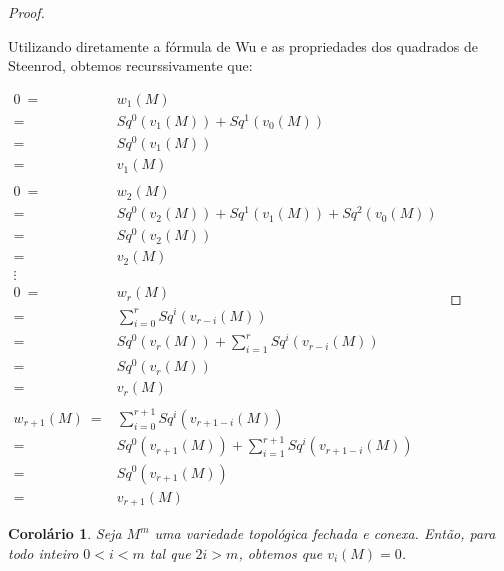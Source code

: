 \documentclass[12pt,oneside]{book} %
\newtheorem{cor}    {\hspace{0.5cm}Corol\'ario}[chapter]
\newcommand{\ds}{\displaystyle}
\begin{document}
\begin{proof}
	
	\
	
	\par Utilizando diretamente a fórmula de Wu e as propriedades dos quadrados de Steenrod, obtemos recurssivamente que: \newline
	
	$ \begin{array}{rl}
		0 \ = & w_{1}(M) \\
		= & Sq^{0}(v_{1}(M))+Sq^{1}(v_{0}(M)) \\
		= & Sq^{0}(v_{1}(M)) \\
		= & v_{1}(M) \\
		& \\
		0 \ = & w_{2}(M) \\
		= & Sq^{0}(v_{2}(M))+Sq^{1}(v_{1}(M))+Sq^{2}(v_{0}(M)) \\
		= & Sq^{0}(v_{2}(M)) \\
		= & v_{2}(M) \\
		\vdots & \\
		0 \ = & w_{r}(M) \\
		= & \ds\sum_{i=0}^{r}Sq^{i}(v_{r-i}(M)) \\
		= & Sq^{0}(v_{r}(M))+\ds\sum_{i=1}^{r}Sq^{i}(v_{r-i}(M)) \\
		= & Sq^{0}(v_{r}(M)) \\
		= & v_{r}(M) \\
		& \\
		w_{r+1}(M) \ = & \ds\sum_{i=0}^{r+1}Sq^{i}(v_{r+1-i}(M)) \\
		= & Sq^{0}(v_{r+1}(M))+\ds\sum_{i=1}^{r+1}Sq^{i}(v_{r+1-i}(M)) \\
		= & Sq^{0}(v_{r+1}(M)) \\
		= & v_{r+1}(M)
	\end{array} $
	
\end{proof}

\begin{cor}\label{ap_wu_3}
	Seja $M^{m}$ uma variedade topológica fechada e conexa. Então, para todo inteiro $0< i< m$ tal que $2i>m$, obtemos que $v_{i}(M)=0$.
\end{cor}
\end{document}
